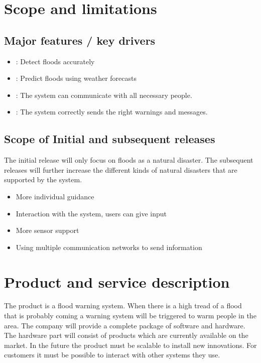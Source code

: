 \section{Scope and limitations}
\subsection{Major features / key drivers}
\begin{itemize}
	\item {}: Detect floods accurately
	\item {}: Predict floods using weather forecasts
	\item {}: The system can communicate with all necessary people.
	\item {}: The system correctly sends the right warnings and messages.
		
\end{itemize}
\subsection{Scope of Initial and subsequent releases}
The initial release will only focus on floods as a natural disaster. The subsequent releases will further increase the different kinds of natural disasters that are supported by the system.\\

	\begin{itemize}
		\item More individual guidance
		\item Interaction with the system, users can give input
		\item More sensor support
		\item Using multiple communication networks to send information
	\end{itemize}

\section{Product and service description}
The product is a flood warning system. When there is a high tread of a flood that is probably coming a warning system will be triggered to warm people in the area. The company will provide a complete package of software and hardware. The hardware part will consist of products which are currently available on the market. In the future the product must be scalable to install new innovations. For customers it must be possible to interact with other systems they use.

